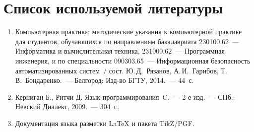 \section*{Список используемой литературы}

\begin{enumerate}
\item Компьютерная практика: методические указания к компьютерной
      практике для студентов, обучающихся по направлениям
      бакалавриата 230100.62~--- Информатика и вычислительная
      техника, 231000.62~--- Программная инженерия, и по
      специальности 090303.65~--- Информационная безопасность
      автоматизированных систем~/ сост. Ю.\,Д.~Рязанов,
      А.\,И.~Гарибов, Т.\,В.~Бондаренко.~--- Белгород: Изд-во БГТУ,
      2014.~--- 44~с.
\item Керниган Б., Ритчи Д. Язык программирования~C.~--- 2-е изд.~---
      СПб.: Невский Диалект, 2009.~--- 304~с.
\item Документация языка разметки \LaTeX{} и пакета TikZ/PGF.
\end{enumerate}
